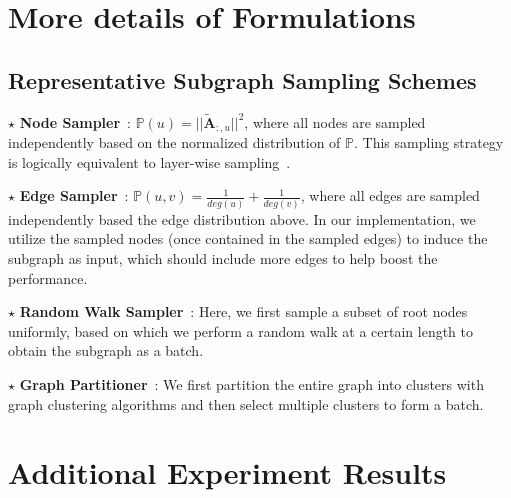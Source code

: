 \message{ !name(main.tex)}\documentclass{article}
\newcommand{\bm}[1]{\mathbf{#1}}
\begin{document}
\clearpage


\clearpage
\appendix
\renewcommand{\thepage}{A\arabic{page}}
\renewcommand{\thesection}{A\arabic{section}}
\renewcommand{\thetable}{A\arabic{table}}
\renewcommand{\thefigure}{A\arabic{figure}}


\section{More details of Formulations}
\subsection{Representative Subgraph Sampling Schemes} \label{app:sampling_schemes}
\(\star\) \textbf{Node Sampler}~\cite{chen2018fastgcn,zeng2019graphsaint}: \(\mathbb{P}(u) = ||\widetilde{\bm{A}}_{:,u}||^2\), where all nodes are sampled independently based on the normalized distribution of \(\mathbb{P}\). This sampling strategy is logically equivalent to layer-wise sampling~\citep{chen2018fastgcn}.

\(\star\) \textbf{Edge Sampler}~\cite{zeng2019graphsaint}: \(\mathbb{P}(u, v) = \frac{1}{deg(u)} + \frac{1}{deg(v)}\), where all edges are sampled independently based the edge distribution above. In our implementation, we utilize the sampled nodes (once contained in the sampled edges) to induce the subgraph as input, which should include more edges to help boost the performance.

\(\star\) \textbf{Random Walk Sampler}~\cite{leskovec2006sampling, zeng2019graphsaint}: Here, we first sample a subset of root nodes uniformly, based on which we perform a random walk at a certain length to obtain the subgraph as a batch.

\(\star\) \textbf{Graph Partitioner}~\cite{chiang2019cluster,karypis1998fast}: We first partition the entire graph into clusters with graph clustering algorithms and then select multiple clusters to form a batch.

\section{Additional Experiment Results}
\end{document}

